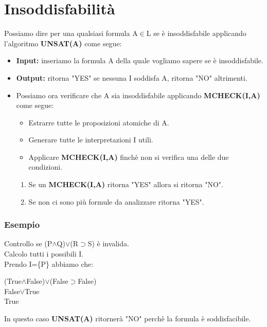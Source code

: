 \documentclass[../main.tex]{subfiles}
\begin{document}
    \section{Insoddisfabilità}
    Possiamo dire per una qualsiasi formula A$\in$L se è insoddisfabile applicando l'algoritmo \textbf{UNSAT(A)} come segue:
    \begin{itemize}
        \item \textbf{Input:} inseriamo la formula A della quale vogliamo sapere se è insoddisfabile.
        \item \textbf{Output:} ritorna "YES" se nessuna I soddisfa A, ritorna "NO" altrimenti.
        \item Possiamo ora verificare che A sia insoddisfabile applicando \textbf{MCHECK(I,A)} come segue:
        \begin{itemize}
            \item Estrarre tutte le proposizioni atomiche di A.
            \item Generare tutte le interpretazioni I utili.
            \item Applicare \textbf{MCHECK(I,A)} finchè non si verifica una delle due condizioni.
        \end{itemize}
        \begin{enumerate}
            \item Se un \textbf{MCHECK(I,A)} ritorna "YES" allora si ritorna "NO".
            \item Se non ci sono più formule da analizzare ritorna "YES".
        \end{enumerate}
    \end{itemize}

    \subsubsection{Esempio}
    Controllo se (P$\land$Q)$\lor$(R$\supset$S) è invalida.\\
    Calcolo tutti i possibili I.\\
    Prendo I=\{P\} abbiamo che:
    \begin{center}
        (True$\land$False)$\lor$(False$\supset$False)\\
        False$\lor$True\\
        True
    \end{center}
    In questo caso \textbf{UNSAT(A)} ritornerà "NO" perchè la formula è soddisfacibile.
\end{document}
